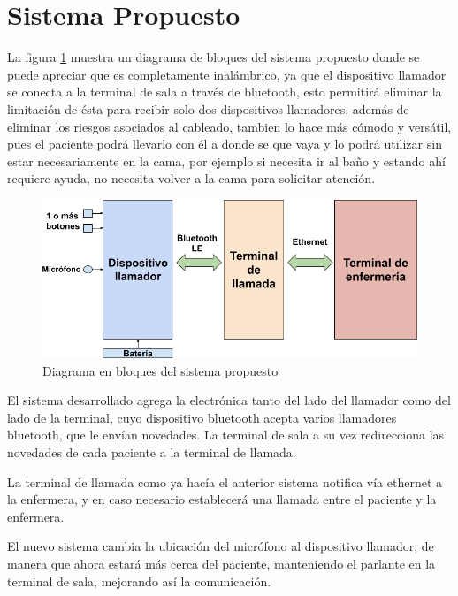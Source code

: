 
\section{Sistema Propuesto}

La figura \ref{fig:DiagramaBloques} muestra un diagrama de bloques del sistema propuesto donde se puede apreciar que es completamente inalámbrico, ya que el dispositivo llamador se conecta a la terminal de sala a través de bluetooth, esto permitirá eliminar la limitación de ésta para recibir solo dos dispositivos llamadores, además de eliminar los riesgos asociados al cableado, tambien lo hace más cómodo y versátil, pues el paciente podrá llevarlo con él a donde se que vaya y lo podrá utilizar sin estar necesariamente en la cama, por ejemplo si necesita ir al baño y estando ahí requiere ayuda, no necesita volver a la cama para solicitar atención.

\begin{figure}[htpb]
	\centering
	\includegraphics[scale=0.5]{./Figures/DiagramaDeBloques.png}
	\caption{Diagrama en bloques del sistema propuesto}
	\label{fig:DiagramaBloques}
\end{figure}

El sistema desarrollado agrega la electrónica tanto del lado del llamador como del lado de la terminal, cuyo dispositivo bluetooth acepta varios llamadores bluetooth, que le envían novedades. La terminal de sala  a su vez redirecciona las novedades de cada paciente a la terminal de llamada.

La terminal de llamada como ya hacía el anterior sistema notifica vía ethernet a la enfermera, y en caso necesario establecerá una llamada entre el paciente y la enfermera.

El nuevo sistema cambia la ubicación del micrófono al dispositivo llamador, de manera que ahora estará más cerca del paciente, manteniendo el parlante en la terminal de sala, mejorando así la comunicación.

